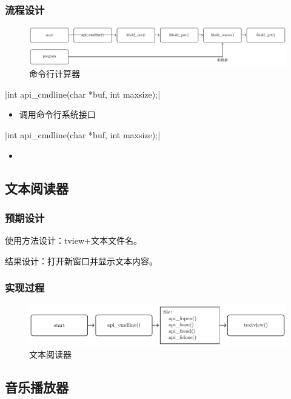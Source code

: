     \subsubsection{流程设计}
    \begin{figure}[h]
        \centering
        \includegraphics[width=.8\textwidth]{../Fig/api/calc.pdf}
        \caption{命令行计算器}
        \label{fig:btss}
      \end{figure}
    
    \csingle|int api_cmdline(char *buf, int maxsize);|
    \begin{itemize}
      \item 调用命令行系统接口
    \end{itemize}
    \csingle|int api_cmdline(char *buf, int maxsize);|
    \begin{itemize}
      \item 
    \end{itemize}

\subsection{文本阅读器}

    \subsubsection{预期设计}

    使用方法设计：tview+文本文件名。

    结果设计：打开新窗口并显示文本内容。
    \subsubsection{实现过程}

      \begin{figure}[h]
        \centering
        \includegraphics[width=.8\textwidth]{../Fig/api/tview.pdf}
        \caption{文本阅读器}
        \label{fig:btss}
      \end{figure}

\subsection{音乐播放器}
